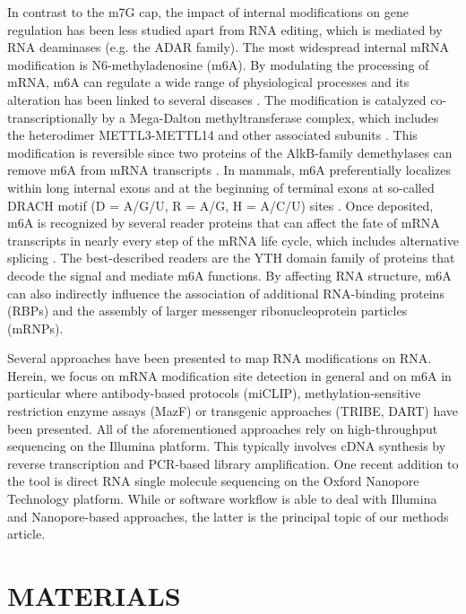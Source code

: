 \documentclass[times, 11pt, a4paper]{article}
\begin{document}
In contrast to the m7G cap, the impact of internal modifications on gene regulation has been less studied apart from RNA editing, which is mediated by RNA deaminases (e.g. the ADAR family). The most widespread internal mRNA modification is N6-methyladenosine (m6A). By modulating the processing of mRNA, m6A can regulate a wide range of physiological processes and its alteration has been linked to several diseases \cite{Roignant2017,Zaccara2019,Shi2019}. The modification is catalyzed co-transcriptionally by a Mega-Dalton methyltransferase complex, which includes the heterodimer METTL3-METTL14 and other associated subunits \cite{GarciasMorales2021}. This modification is reversible since two proteins of the AlkB-family demethylases can remove m6A from mRNA transcripts \citep{Jia2011,Zheng2013}. In mammals, m6A preferentially localizes within long internal exons and at the beginning of terminal exons at so-called DRACH motif (D = A/G/U, R = A/G, H = A/C/U) sites \citep{Dominissini2012,Meyer2012,Ke2015}. Once deposited, m6A is recognized by several reader proteins that can affect the fate of mRNA transcripts in nearly every step of the mRNA life cycle, which includes alternative splicing \citep{Adhikari2016,Roundtree2017}. The best-described readers are the YTH domain family of proteins that decode the signal and mediate m6A functions. By affecting RNA structure, m6A can also indirectly influence the association of additional RNA-binding proteins (RBPs) and the assembly of larger messenger ribonucleoprotein particles (mRNPs).

Several approaches have been presented to map RNA modifications on RNA. Herein, we focus on mRNA modification site detection in general and on m6A in particular where antibody-based protocols (miCLIP), methylation-sensitive restriction enzyme assays (MazF) or transgenic approaches (TRIBE, DART) have been presented. All of the aforementioned approaches rely on high-throughput sequencing on the Illumina platform. This typically involves cDNA synthesis by reverse transcription and PCR-based library amplification. One recent addition to the tool is direct RNA single molecule sequencing on the Oxford Nanopore Technology platform. While or software workflow is able to deal with Illumina and Nanopore-based approaches, the latter is the principal topic of our methods article.

\section*{MATERIALS}
\end{document}
